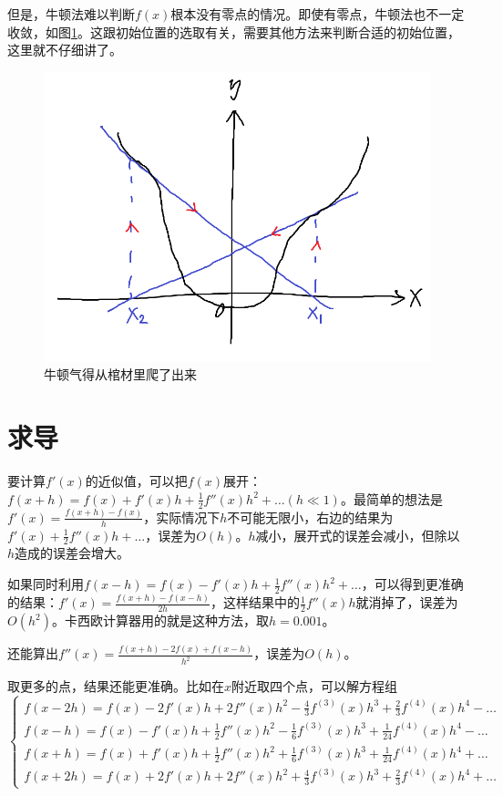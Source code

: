 但是，牛顿法难以判断$f(x)$根本没有零点的情况。即使有零点，牛顿法也不一定收敛，如图\ref{fig-newton-iter-boom}。这跟初始位置的选取有关，需要其他方法来判断合适的初始位置，这里就不仔细讲了。
\begin{figure}[htb]
\centering
\includegraphics[scale=0.5]{fig/newton-iter-boom}
\caption{牛顿气得从棺材里爬了出来}
\label{fig-newton-iter-boom}
\end{figure}
\section{求导}
要计算$f'(x)$的近似值，可以把$f(x)$展开：$f(x+h)=f(x)+f'(x) h+\frac{1}{2} f''(x) h^2+\dots(h \ll 1)$。最简单的想法是$f'(x)=\frac{f(x+h)-f(x)}{h}$，实际情况下$h$不可能无限小，右边的结果为$f'(x)+\frac{1}{2} f''(x) h+\dots$，误差为$O(h)$。$h$减小，展开式的误差会减小，但除以$h$造成的误差会增大。

如果同时利用$f(x-h)=f(x)-f'(x) h+\frac{1}{2} f''(x) h^2+\dots$，可以得到更准确的结果：$f'(x)=\frac{f(x+h)-f(x-h)}{2 h}$，这样结果中的$\frac{1}{2} f''(x) h$就消掉了，误差为$O(h^2)$。卡西欧计算器用的就是这种方法，取$h=0.001$。

还能算出$f''(x)=\frac{f(x+h)-2 f(x)+f(x-h)}{h^2}$，误差为$O(h)$。

取更多的点，结果还能更准确。比如在$x$附近取四个点，可以解方程组
\begin{equation*}
\begin{cases}
f(x-2 h)=f(x)-2 f'(x) h+2 f''(x) h^2-\frac{4}{3} f^{(3)}(x) h^3+\frac{2}{3} f^{(4)}(x) h^4-\dots \\
f(x-h)=f(x)-f'(x) h+\frac{1}{2} f''(x) h^2-\frac{1}{6} f^{(3)}(x) h^3+\frac{1}{24} f^{(4)}(x) h^4-\dots \\
f(x+h)=f(x)+f'(x) h+\frac{1}{2} f''(x) h^2+\frac{1}{6} f^{(3)}(x) h^3+\frac{1}{24} f^{(4)}(x) h^4+\dots \\
f(x+2 h)=f(x)+2 f'(x) h+2 f''(x) h^2+\frac{4}{3} f^{(3)}(x) h^3+\frac{2}{3} f^{(4)}(x) h^4+\dots
\end{cases}
\end{equation*}

